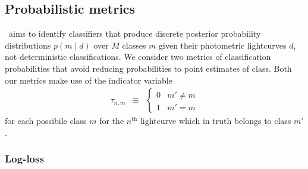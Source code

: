 
\subsection{Probabilistic metrics}
\label{sec:probabilistic}

\plasticc\ aims to identify classifiers that produce discrete posterior probability distributions $p(m \mid d)$ over $M$ classes $m$ given their photometric lightcurves $d$, not deterministic classifications.
We consider two metrics of classification probabilities that avoid reducing probabilities to point estimates of class.
Both our metrics make use of the indicator variable
\begin{eqnarray}
  \label{eq:indicator}
  \tau_{n, m} &\equiv& \begin{cases}
  0 & m' \neq m\\
  1 & m' = m
  \end{cases}
\end{eqnarray}
for each possibile class $m$ for the $n^{\mathrm{th}}$ lightcurve which in truth belongs to class $m'$.

\subsubsection{Log-loss}
\label{sec:logloss}

